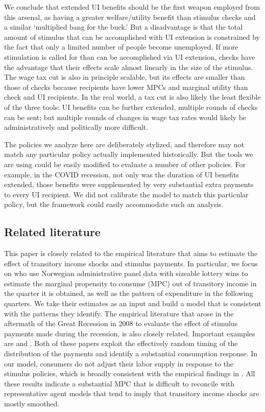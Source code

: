 \documentclass[../HAFiscal]{subfiles}
\begin{document}
We conclude that extended UI benefits should be the first weapon employed from this arsenal, as having a greater welfare/utility benefit than stimulus checks and a similar `multiplied bang for the buck.' But a disadvantage is that the total amount of stimulus that can be accomplished with UI extension is constrained by the fact that only a limited number of people become unemployed.  If more stimulation is called for than can be accomplished via UI extension, checks have the advantage that their effects scale almost linearly in the size of the stimulus.  The wage tax cut is also in principle scalable, but its effects are smaller than those of checks because recipients have lower MPCs and marginal utility than check and UI recipients.  In the real world, a tax cut is also likely the least flexible of the three tools:  UI benefits can be further extended, multiple rounds of checks can be sent; but multiple rounds of changes in wage tax rates would likely be administratively and politically more difficult.

The policies we analyze here are deliberately stylized, and therefore may not match any particular policy actually implemented historically.  But the tools we are using could be easily modified to evaluate a number of other policies.  For example, in the COVID recession, not only was the duration of UI benefits extended, those benefits were supplemented by very substantial extra payments to every UI recipient.  We did not calibrate the model to match this particular policy, but the framework could easily accommodate such an analysis.

\subsection{Related literature}
\label{sec:lit}

This paper is closely related to the empirical literature that aims to estimate the effect of transitory income shocks and stimulus payments. In particular, we focus on \cite{fagereng_mpc_2021} who use Norwegian administrative panel data with sizeable lottery wins to estimate the marginal propensity to consume (MPC) out of transitory income in the quarter it is obtained, as well as the pattern of expenditure in the following quarters. We take their estimates as an input and build a model that is consistent with the patterns they identify. The empirical literature that arose in the aftermath of the Great Recession in 2008 to evaluate the effect of stimulus payments made during the recession, is also closely related. Important examples are \cite{parker2013consumer} and \cite{broda2014economic}. Both of these papers exploit the effectively random timing of the distribution of the payments and identify a substantial consumption response. In our model, consumers do not adjust their labor supply in response to the stimulus policies, which is broadly consistent with the empirical findings in \cite{ganong2022spending}. All these results indicate a substantial MPC that is difficult to reconcile with representative agent models that tend to imply that transitory income shocks are mostly smoothed. 
\end{document}
